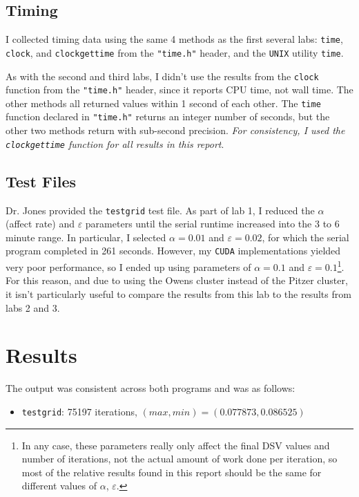 \documentclass{article}
\begin{document}
\subsection*{Timing}
\label{subsec:timing}

I collected timing data using the same 4 methods as the first several labs:
\texttt{time}, \texttt{clock}, and \texttt{clock\textunderscore gettime} from
the \texttt{"time.h"} header, and the \texttt{UNIX} utility \texttt{time}.

As with the second and third labs, I didn't use the results from the \texttt{clock}
function from the \texttt{"time.h"} header, since it reports CPU time, not wall
time. The other methods all returned values within 1 second of each other. The
\texttt{time} function declared in \texttt{"time.h"} returns an integer number
of seconds, but the other two methods return with sub-second precision.
\emph{For consistency, I used the \texttt{clock\textunderscore gettime}
function for all results in this report}.

\subsection*{Test Files}
\label{subsec:test_files}

Dr. Jones provided the \texttt{testgrid} test file.  As part of lab 1, I reduced the $\alpha$ (affect rate) and
$\varepsilon$ parameters until the serial runtime increased into the 3 to 6
minute range. In particular, I selected $\alpha = 0.01$ and $\varepsilon =
0.02$, for which the serial program completed in 261 seconds. However, my \texttt{CUDA}
implementations yielded very poor performance, so I ended up using parameters of
$\alpha = 0.1$ and $\varepsilon = 0.1$\footnote{In any case, these parameters really
only affect the final DSV values and number of iterations, not the actual amount of work
done per iteration, so most of the relative results found in this report should be the same
for different values of $\alpha$, $\varepsilon$.}.  For this reason, and due to using the
Owens cluster instead of the Pitzer cluster, it isn't particularly useful to
compare the results from this lab to the results from labs 2 and 3.

\newpage
\section*{Results}
\label{sec:results}

The output was consistent across both programs and was as follows:
\begin{itemize}
    \item \texttt{testgrid}: 75197 iterations, $(max, min) = (0.077873, 0.086525)$
\end{itemize}
\end{document}
